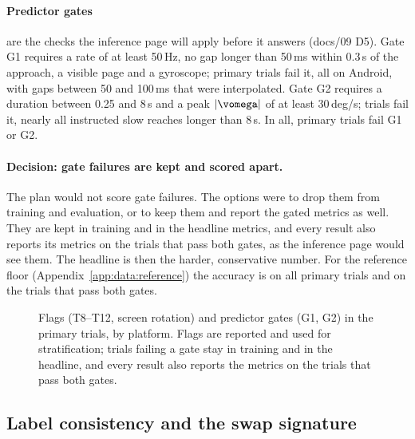 \paragraph{Predictor gates} are the checks the inference page will apply before it answers (docs/09 D5). Gate
G1 requires a rate of at least 50\,Hz, no gap longer than 50\,ms within 0.3\,s of the approach, a visible page
and a gyroscope;  primary trials fail it, all on Android, with gaps between 50 and
100\,ms that were interpolated. Gate G2 requires a duration between 0.25 and 8\,s and a peak $|\vomega|$ of at
least 30\,deg/s;  trials fail it, nearly all instructed slow reaches longer than
8\,s. In all,  primary trials fail G1 or G2.

\paragraph{Decision: gate failures are kept and scored apart.} The plan would not score gate failures. The
options were to drop them from training and evaluation, or to keep them and report the gated metrics as well.
They are kept in training and in the headline metrics, and every result also reports its metrics on the trials
that pass both gates, as the inference page would see them. The headline is then the harder, conservative
number. For the reference floor (Appendix~\ref{app:data:reference}) the accuracy is
 on all primary trials and  on the trials that pass both
gates.

\begin{figure}[htbp]
\centering
{}
\caption{Flags (T8--T12, screen rotation) and predictor gates (G1, G2) in the primary trials, by platform.
Flags are reported and used for stratification; trials failing a gate stay in training and in the headline,
and every result also reports the metrics on the trials that pass both gates.}
\label{fig:S2_18_flags_gates}
\end{figure}


\subsection{Label consistency and the swap signature}\label{app:data:labels}

